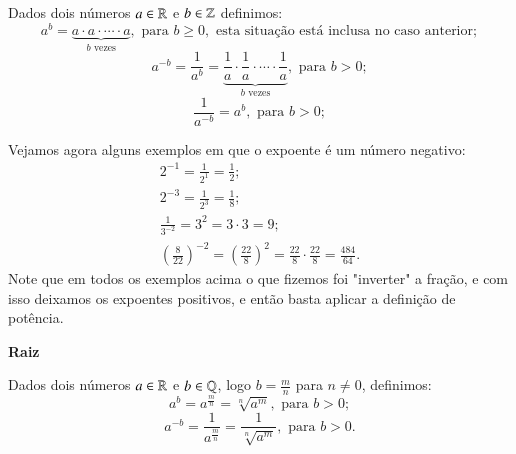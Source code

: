  \vskip0.3cm

 \colorbox{azul}{
 \begin{minipage}{0.9\linewidth}
 \begin{center}
   Dados dois números $a \in \mathbb{R}$ e $b \in \mathbb{Z}$ definimos:
 \[a^b= \underbrace{a \cdot a \cdot \cdots \cdot a}_{b \text{ vezes}}, \text{ para } b\geq0, \text{ esta situação está inclusa no caso anterior};\]
 \[a^{-b}= \frac{1}{a^b}= \underbrace{\frac{1}{a} \cdot \frac{1}{a} \cdot \cdots \cdot \frac{1}{a}}_{b \text{ vezes}}, \text{ para } b>0 ;\]
 \[\frac{1}{a^{-b}}= a^b, \text{ para } b>0;\]
 \end{center}
 \end{minipage}}

 \vskip0.3cm

 \begin{exem}
 Vejamos agora alguns exemplos em que o expoente é um número negativo:
 \begin{eqnarray*}
  2^{-1}= \frac{1}{2^{1}}= \frac{1}{2}; \\
  2^{-3}= \frac{1}{2^3}= \frac{1}{8}; \\
  \frac{1}{3^{-2}}= 3^2= 3 \cdot 3= 9; \\
  \left( \frac{8}{22} \right)^{-2}= \left( \frac{22}{8} \right)^{2}= \frac{22}{8} \cdot \frac{22}{8}= \frac{484}{64}.
 \end{eqnarray*}
 Note que em todos os exemplos acima o que fizemos foi "inverter" a fração, e com isso deixamos os expoentes positivos, e então basta aplicar a definição de potência.

 \end{exem}

 \vskip0.3cm

 \textbf{Raiz}

 \vskip0.3cm

 \colorbox{azul}{
 \begin{minipage}{0.9\linewidth}
 \begin{center}
  Dados dois números $a \in \mathbb{R}$ e $b \in \mathbb{Q}$, logo $b= \frac{m}{n}$ para $n \neq 0$, definimos:
 \[a^b= a^{\frac{m}{n}}= \sqrt[n]{a^m}, \text{ para } b>0 ;\]
 \[a^{-b}= \frac{1}{a^{\frac{m}{n}}}= \frac{1}{\sqrt[n]{a^m}},  \text{ para } b>0.\]
 \end{center}
 \end{minipage}}

 \vskip0.3cm

